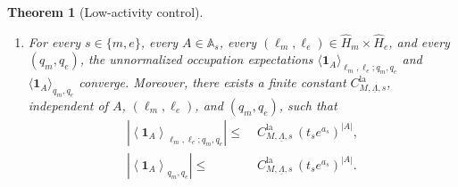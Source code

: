 \documentclass[dvipsnames,a4paper]{article}
\numberwithin{equation}{section}
\newtheorem{theorem}{Theorem}[section]
\theoremstyle{definition}
\theoremstyle{remark}
\begin{document}
\begin{theorem}[Low-activity control]
\begin{enumerate}[label=(\roman*)]
		\item \label{thmItem:occFinite}
		For every \(s\in\{m,e\}\), every \(A\in\mathbb A_s\), every
		\((\ell_m,\ell_e)\in\widehat H_m\times\widehat H_e\), and every \((q_m,q_e)\), the
		unnormalized occupation expectations
		\(\langle \mathbf 1_A\rangle_{\ell_m,\ell_e;q_m,q_e}\) and
		\(\langle \mathbf 1_A\rangle_{q_m,q_e}\) converge. Moreover, there exists a finite
		constant \(C_{M,\underline\Lambda,s}^{\mathrm{la}}\), independent of \(A\),
		\((\ell_m,\ell_e)\), and \((q_m,q_e)\), such that
		\begin{align}
			\left|
			\left\langle \mathbf 1_A \right\rangle_{\ell_m,\ell_e;q_m,q_e}
			\right|
			\le&\;
			C_{M,\underline\Lambda,s}^{\mathrm{la}}\,(t_s e^{a_s})^{|A|},
			\label{eq:sector-occupancy-bound}
		\\
			\left|
			\left\langle \mathbf 1_A \right\rangle_{q_m,q_e}
			\right|
			\le&\;
			C_{M,\underline\Lambda,s}^{\mathrm{la}}\,(t_s e^{a_s})^{|A|}.
			\label{eq:fixed-background-occupancy-bound}
		\end{align}
	\end{enumerate}
\end{theorem}
\end{document}
